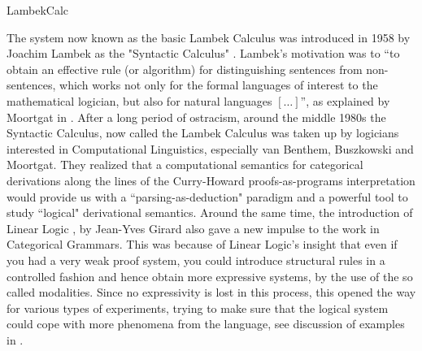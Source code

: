 \begin{entry}{LambekCalc}
\begin{history}
The system now known as the basic Lambek Calculus was introduced in
1958 by Joachim Lambek as the "Syntactic Calculus" \cite{lambek1958}.
Lambek's motivation was to ``to obtain an effective rule (or
algorithm) for distinguishing sentences from non-sentences, which
works not only for the formal languages of interest to the
mathematical logician, but also for natural languages $[\ldots]$'', as
explained by Moortgat in \cite{moortgat2010}.  After a long period of
ostracism, around the middle 1980s the Syntactic Calculus, now called
the Lambek Calculus was taken up by logicians interested in
Computational Linguistics, especially van Benthem, Buszkowski and
Moortgat. They realized that a computational semantics for categorical
derivations along the lines of the Curry-Howard proofs-as-programs
interpretation would provide us with a ``parsing-as-deduction"
paradigm and a powerful tool to study ``logical" derivational
semantics. Around the same time, the introduction of Linear Logic
, by Jean-Yves Girard also gave a new impulse to the work in
Categorical Grammars. This was because of Linear Logic's insight that
even if you had a very weak proof system, you could introduce
structural rules in a controlled fashion and hence obtain more
expressive systems, by the use of the so called modalities. Since no
expressivity is lost in this process, this opened the way for various
types of experiments, trying to make sure that the logical system
could cope with more phenomena from the language, see discussion of
examples in \cite{moortgat2010}.
\end{history}


\end{entry}
